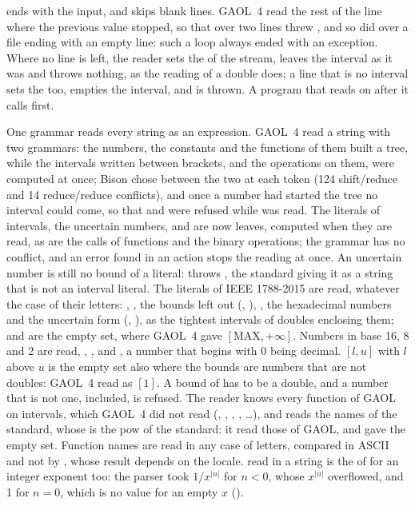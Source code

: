 \documentclass[12pt,a4paper,twoside,openright]{book}
\begin{document}
\medskip
{} ends with the input, and skips blank lines.\newinvfive{}
GAOL~4 read the rest of the line where the previous value stopped, so that
 over two lines threw , and so
did  over a file ending with an empty line: such a loop
always ended with an exception. Where no line is left, the reader sets the
 of the stream, leaves the interval as it was and throws
nothing, as the reading of a double does; a line that is no interval sets the
 too, empties the interval, and 
is thrown. A program that reads on after it calls  first.

\medskip
One grammar reads every string as an expression.\newinvfive{} GAOL~4 read a
string with two grammars: the numbers, the constants and the functions of
them built a tree, while the intervals written between brackets, and the
operations on them, were computed at once; Bison chose between the two at
each token (124 shift/reduce and 14 reduce/reduce conflicts), and once a
number had started the tree no interval could come, so that 
and  were refused while  was read. The
literals of intervals, the uncertain numbers,  and 
are now leaves, computed when they are read, as are the calls of functions
and the binary operations; the grammar has no conflict, and an error found
in an action stops the reading at once. An uncertain number is still no
bound of a literal: \code{[5?1]} throws , the
standard giving it as a string that is not an interval literal. The literals
of IEEE 1788-2015 are read, whatever the case of their letters: \code{[ ]},
\code{[entire]}, the bounds left out (\code{[1,]}, \code{[,]}),
, the hexadecimal numbers and the uncertain form
(, ), as the tightest intervals of doubles
enclosing them; \code{[inf]} and  are the empty set, where
GAOL~4 gave $[\mathrm{MAX}, +\infty]$. Numbers in base 16, 8 and 2 are read,
, ,  and , a number that
begins with 0 being decimal. $[l, u]$ with $l$ above $u$ is the empty set
also where the bounds are numbers that are not doubles: GAOL~4 read
\code{[1.00000000000000001, 1]} as $[1]$. A bound of  has to be
a double, and a number that is not one,  included, is refused. The
reader knows every function of GAOL on intervals, which GAOL~4 did not read
(, , , , \ldots), and
 reads the names of the standard,
whose  is the pow of the standard: it read those of GAOL, and
 gave the empty set. Function names are read in any case of
letters, compared in ASCII and not by , whose result
depends on the locale.  read in a string is the 
of  for an integer exponent too: the parser took $1/x^{|n|}$ for
$n < 0$, whose $x^{|n|}$ overflowed, and 1 for $n = 0$, which is no value for
an empty $x$ ().
\end{document}
